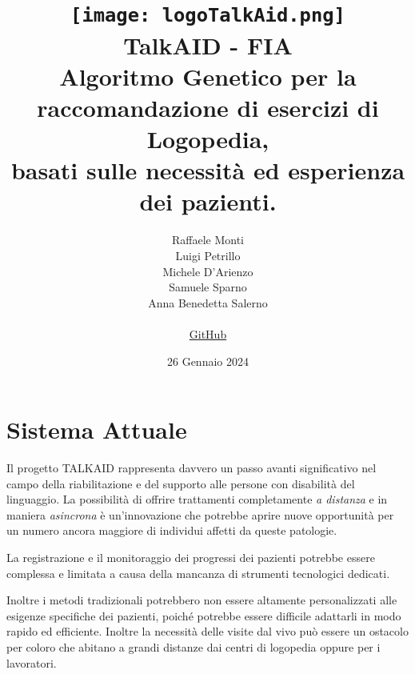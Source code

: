 \documentclass{article}
\begin{document}
    \title{
    \texttt{[image: logoTalkAid.png]} \\[1cm]
    \textbf{TalkAID - FIA}\\
    \vspace{0.5cm}
    \large Algoritmo Genetico per la raccomandazione di esercizi di Logopedia,\\
    basati sulle necessità ed esperienza dei pazienti.
}
    \author{
    Raffaele Monti\\
    Luigi Petrillo\\
    Michele D'Arienzo\\
     Samuele Sparno\\
    Anna Benedetta Salerno\\
    \vspace{0.5cm}
    \\
    \href{https://github.com/r-monti/fia}{GitHub}
}
    \date{26 Gennaio 2024}

    \maketitle

    \pagebreak

    \tableofcontents

    \pagebreak

    \section{Sistema Attuale}

    Il progetto TALKAID rappresenta davvero un passo avanti significativo nel campo della riabilitazione e del supporto alle persone con disabilità del linguaggio. La possibilità di offrire trattamenti completamente \textit{a distanza} e in maniera \textit{asincrona} è un'innovazione che potrebbe aprire nuove opportunità per un numero ancora maggiore di individui affetti da queste patologie.

    La registrazione e il monitoraggio dei progressi dei pazienti potrebbe essere complessa e limitata a causa della mancanza di strumenti tecnologici dedicati.

    Inoltre i metodi tradizionali potrebbero non essere altamente personalizzati alle esigenze specifiche dei pazienti, poiché potrebbe essere difficile adattarli in modo rapido ed efficiente. Inoltre la necessità delle visite dal vivo può essere un ostacolo per coloro che abitano a grandi distanze dai centri di logopedia oppure per i lavoratori.
\end{document}
